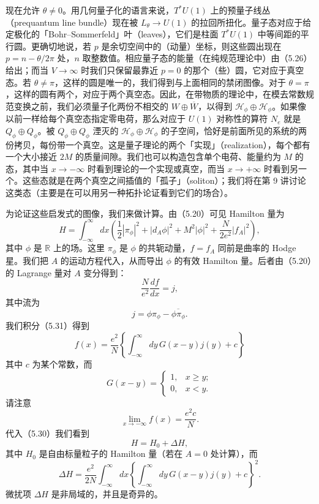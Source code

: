 现在允许 $\theta\neq0$。用几何量子化的语言来说，$T^*U(1)$ 上的预量子线丛（prequantum line bundle）现在被 $L_\theta\to U(1)$ 的拉回所扭化。量子态对应于给定极化的「Bohr–Sommerfeld」叶（leaves），它们是柱面 $T^*U(1)$ 中等间距的平行圆。更确切地说，若 $p$ 是余切空间中的（动量）坐标，则这些圆出现在 $p=n-\theta/2\pi$ 处，$n$ 取整数值。相应量子态的能量（在纯规范理论中）由（5.26）给出；而当 $V\to\infty$ 时我们只保留最靠近 $p=0$ 的那个（些）圆，它对应于真空态。若 $\theta\neq\pi$，这样的圆是唯一的，我们得到与上面相同的禁闭图像。对于 $\theta=\pi$，这样的圆有两个，对应于两个真空态。因此，在带物质的理论中，在模去常数规范变换之前，我们必须量子化两份不相交的 $W\oplus\overline{W}$，以得到 $\mathcal{H}_\phi\oplus\mathcal{H}_\phi$。如果像以前一样给每个真空态指定零电荷，那么对应于 $U(1)$ 对称性的算符 $N_e$ 就是 $Q_\phi\oplus Q_\phi$。被 $Q_\phi\oplus Q_\phi$ 湮灭的 $\mathcal{H}_\phi\oplus\mathcal{H}_\phi$ 的子空间，恰好是前面所见的系统的两份拷贝，每份带一个真空。这是量子理论的两个「实现」（realization），每个都有一个大小接近 $2M$ 的质量间隙。我们也可以构造包含单个电荷、能量约为 $M$ 的态，其中当 $x\to-\infty$ 时看到理论的一个实现或真空，而当 $x\to+\infty$ 时看到另一个。这些态就是在两个真空之间插值的「孤子」（soliton）；我们将在第 9 讲讨论这类态（主要是在可以用另一种拓扑论证看到它们的场合）。

为论证这些启发式的图像，我们来做计算。由（5.20）可见 Hamilton 量为
\begin{equation}
  \tag{5.30}
  \label{eq:5-30}
  H=\int_{-\infty}^{\infty}dx\left(\frac{1}{2}|\pi_\phi|^2+|d_A\phi|^2+M^2|\phi|^2+\frac{N}{2e^2}|f_A|^2\right),
\end{equation}
其中 $\phi$ 是 $\mathbb{R}$ 上的场。这里 $\pi_\phi$ 是 $\phi$ 的共轭动量，$f=f_A$ 同前是曲率的 Hodge 星。我们把 $A$ 的运动方程代入，从而导出 $\phi$ 的有效 Hamilton 量。后者由（5.20）的 Lagrange 量对 $A$ 变分得到：
\begin{equation}
  \tag{5.31}
  \label{eq:5-31}
  \frac{N}{e^2}\frac{df}{dx}=j,
\end{equation}
其中流为
\[
  j=\phi\pi_\phi-\overline{\phi\pi_\phi}.
\]
我们积分（5.31）得到
\begin{equation}
  \tag{5.32}
  \label{eq:5-32}
  f(x)=\frac{e^2}{N}\left\{\int_{-\infty}^{\infty}dy\,G(x-y)j(y)+c\right\}
\end{equation}
其中 $c$ 为某个常数，而
\[
  G(x-y)=\begin{cases}1,&x\ge y;\\ 0,&x<y.\end{cases}
\]
请注意
\begin{equation}
  \tag{5.33}
  \label{eq:5-33}
  \lim_{x\to-\infty}f(x)=\frac{e^2c}{N}.
\end{equation}
代入（5.30）我们看到
\[
  H=H_0+\Delta H,
\]
其中 $H_0$ 是自由标量粒子的 Hamilton 量（若在 $A=0$ 处计算），而
\[
  \Delta H=\frac{e^2}{2N}\int_{-\infty}^{\infty}dx\left\{\int_{-\infty}^{\infty}dy\,G(x-y)j(y)+c\right\}^2.
\]
微扰项 $\Delta H$ 是非局域的，并且是奇异的。

